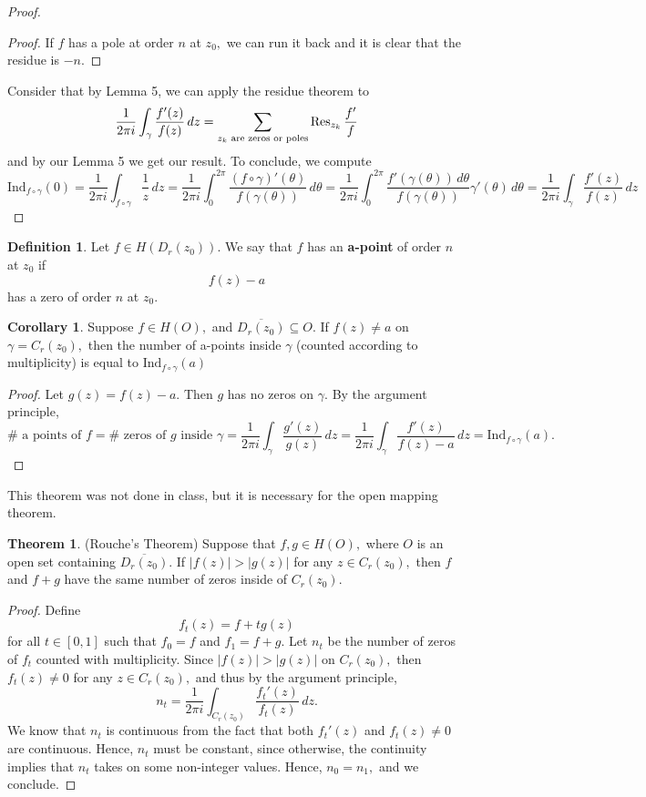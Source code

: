 \documentclass[10pt, oneside]{article}
\newcommand{\Ind}{\text{Ind}}
\theoremstyle{definition}
\newtheorem{thm}{Theorem}
\newtheorem{defn}{Definition}
\newtheorem{cor}{Corollary}
\begin{document}
\begin{proof}
\begin{proof}
        If $f$ has a pole at order $n$ at $z_0,$ we can run it back and it is clear that the residue is $-n.$
    \end{proof}
    Consider that by Lemma 5, we can apply the residue theorem to 
    \[\frac{1}{2\pi i }\int_{\gamma} \frac{f'(z)}{f(z)}\,dz=  \sum_{z_k \text{ are zeros or poles}} \Res_{z_k}\frac{f'}{f}\] and by our Lemma 5 we get our result. To conclude, we compute
    \[\Ind_{f\circ \gamma} (0)= \frac{1}{2\pi i}\int_{f\circ \gamma}\frac{1}{z}\,dz = \frac{1}{2\pi i}\int_{0}^{2\pi}\frac{(f\circ \gamma)'(\theta)}{f(\gamma(\theta))}\,d\theta = \frac{1}{2\pi i}\int_0^{2\pi}\frac{f'(\gamma(\theta))\,d\theta}{f(\gamma(\theta))}\gamma'(\theta)\,d\theta = \frac{1}{2\pi i}\int_{\gamma} \frac{f'(z)}{f(z)}\,dz\]
\end{proof}

\begin{defn}
    Let $f\in H(D_r(z_0)).$ We say that $f$ has an \textbf{a-point} of order $n$ at $z_0$ if 
    \[f(z) - a\] has a zero of order $n$ at $z_0.$ 
\end{defn}
\begin{cor}
    Suppose $f \in H(O),$ and $\overline{D_r(z_0)}\subseteq O.$ If $f(z) \neq a$ on $\gamma = C_r(z_0),$  then the number of a-points inside $\gamma$  (counted according to multiplicity) is equal to $\Ind_{f\circ \gamma}(a)$
\end{cor}
\begin{proof}
    Let $g(z) = f(z) -a.$ Then $g$ has no zeros on $\gamma.$ By the argument principle, 
    \[\# \text{ a points of $f$} = \# \text{ zeros of $g$ inside $\gamma$} = \frac{1}{2\pi i}\int_\gamma \frac{g'(z)}{g(z)}\,dz = \frac{1}{2\pi i}\int_\gamma \frac{f'(z)}{f(z) - a}\,dz= \Ind_{f\circ \gamma}(a).\]
\end{proof}

This theorem was not done in class, but it is necessary for the open mapping theorem. 
\begin{thm}
    (Rouche's Theorem) Suppose that $f, g \in H(O),$ where $O$ is an open set containing $\overline{D_r(z_0)}.$ If $|f(z)| > |g(z)|$ for any $z\in C_r(z_0),$ then 
    $f$ and $f + g$ have the same number of zeros inside of $C_r(z_0).$
\end{thm}

\begin{proof}
    Define 
    \[f_t(z) = f + tg(z)\] for all $t\in [0,1]$ such that $f_0 = f$ and $f_1 = f + g.$ Let $n_t$ be the number of zeros of $f_t$ counted with multiplicity.  Since $|f(z)| > |g(z)|$ on $C_r(z_0),$ then $f_t(z)\neq 0$ for any $z\in C_r(z_0),$ and thus by the argument principle, 
    \[n_t = \frac{1}{2\pi i}\int_{C_r(z_0)}\frac{f_t'(z)}{f_t(z)}\,dz.\] We know that $n_t$ is continuous from the fact that both $f_t'(z)$ and $f_t(z) \neq 0$ are continuous. Hence, $n_t$ must be constant, since otherwise, the continuity implies that $n_t$ takes on some non-integer values. Hence, $n_0 = n_1,$ and we conclude. 
\end{proof}
\end{document}
